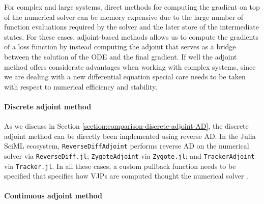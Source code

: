 
For complex and large systems, direct methods for computing the gradient on top of the numerical solver can be memory expensive due to the large number of function evaluations required by the solver and the later store of the intermediate states. 
For these cases, adjoint-based methods allows us to compute the gradients of a loss function by instead computing the adjoint that serves as a bridge between the solution of the ODE and the final gradient. 
If well the adjoint method offers considerate advantages when working with complex systems, since we are dealing with a new differential equation special care needs to be taken with respect to numerical efficiency and stability.

\paragraph{Discrete adjoint method}

As we discuss in Section \ref{section:comparison-discrete-adjoint-AD}, the discrete adjoint method can be directly been implemented using reverse AD. 
In the Julia SciML ecosystem, \texttt{ReverseDiffAdjoint} performs reverse AD on the numerical solver via \texttt{ReverseDiff.jl}; \texttt{ZygoteAdjoint} via \texttt{Zygote.jl}; and \texttt{TrackerAdjoint} via \texttt{Tracker.jl}. 
In all these cases, a custom pullback function needs to be specified that specifies how VJPs are computed thought the numerical solver \cite{rackauckas2021generalized}.


\paragraph{Continuous adjoint method}

